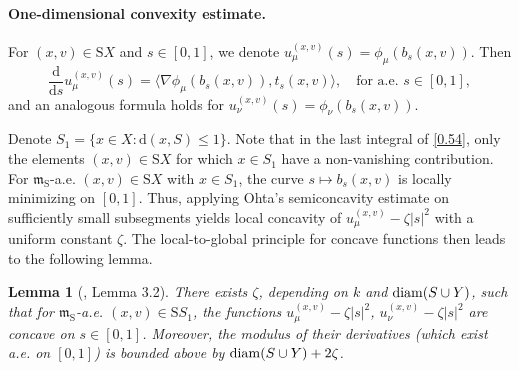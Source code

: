 \documentclass[a4paper,11pt]{article}
\numberwithin{equation}{section}
\theoremstyle{plain}
\newtheorem{lemma}[theorem]{Lemma}
\theoremstyle{definition}
\theoremstyle{remark}
\newcommand{\mm}{\mathfrak m}
\newcommand{\rS}{\mathrm{S}}
\newcommand{\diam}{\mathop{\rm diam}\nolimits}
\renewcommand{\d}{{\mathrm d}}
\begin{document}
	\paragraph{One-dimensional convexity estimate.}
	
	For $(x,v)\in {\rS}X$ and $s\in[0,1]$,   we denote $u_\mu^{(x,v)}(s)=\phi_\mu(b_s(x,v))$.   Then
	\begin{equation*}
		\frac{\d}{\d s}u_\mu^{(x,v)}(s)=\langle\nabla\phi_\mu(b_s(x,v)), t_s(x,v)\rangle, \quad \text{for a.e. $s\in [0,1]$},
	\end{equation*}
	and an analogous formula holds for $u_\nu^{(x,v)}(s)=\phi_\nu(b_s(x,v))$.   
	
		Denote $S_1=\{x\in X: \d(x, S)\leq 1\}$.  Note that in the last integral of \eqref{0.54}, only the elements $(x,v)\in {\rS}X$ for which $x\in S_1$ have a non-vanishing contribution.  For $\mm_\rS$-a.e. $(x,v)\in {\rS}X$ with $x\in S_1$, the curve $s\mapsto b_s(x,v)$ is locally minimizing on $[0,1]$. Thus, applying Ohta's semiconcavity estimate  \cite[Lemma 3.2]{zbMATH05549756}  on sufficiently small subsegments yields local concavity of $u^{(x,v)}_\mu-\zeta |s|^2$ with a uniform constant $\zeta$. The local-to-global principle for concave functions then leads to the following lemma.
	
	
	\begin{lemma}[\cite{zbMATH05549756}, Lemma 3.2]\label{l0.17}
		There exists $\zeta$, depending on $k$ and $\diam(S\cup Y)$, such that for $\mm_\rS$-a.e. $(x,v)\in {\rS}{S_1}$, the functions $u_\mu^{(x,v)}-\zeta|s|^2$, $u_\nu^{(x,v)}-\zeta|s|^2$ are concave on $s\in[0,1]$. Moreover, the modulus of their derivatives (which exist a.e. on $[0,1]$) is bounded above by $\diam(S\cup Y)+2\zeta $.
	\end{lemma}
		
\end{document}
